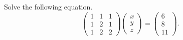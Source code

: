 \documentclass[12pt]{article} %
\begin{document}
\begin{problem}
Solve the following equation.
\[
\begin{pmatrix} 1 & 1 & 1 \\ 1 & 2 & 1 \\ 1 & 2 & 2 \end{pmatrix} \begin{pmatrix} x \\ y \\ z \end{pmatrix} = \begin{pmatrix} 6 \\ 8 \\ 11 \end{pmatrix}.
\]
\end{problem}
\end{document}
